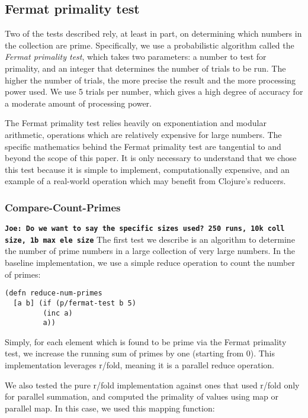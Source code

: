 \documentclass[12pt]{article}
\newcommand{\comment}[1]{{\bf \tt  {#1}}}
\newcommand{\joecomment}[1]{\textcolor{JoesGold}{\comment{Joe: {#1}}}}
\begin{document}
\subsection{Fermat primality test}\label{sec:fermat}
Two of the tests described rely, at least in part, on determining which numbers in the collection are prime. Specifically, we use a probabilistic algorithm called the \emph{Fermat primality test}, which takes two parameters: a number to test for primality, and an integer that determines the number of trials to be run. The higher the number of trials, the more precise the result and the more processing power used. We use 5 trials per number, which gives a high degree of accuracy for a moderate amount of processing power.

The Fermat primality test relies heavily on exponentiation and modular arithmetic, operations which are relatively expensive for large numbers. The specific mathematics behind the Fermat primality test are tangential to and beyond the scope of this paper. It is only necessary to understand that we chose this test because it is simple to implement, computationally expensive, and an example of a real-world operation which may benefit from Clojure's reducers.

\subsubsection{Compare-Count-Primes}\label{sec:count-primes}
\joecomment{Do we want to say the specific sizes used? 250 runs, 10k coll size, 1b max ele size}
The first test we describe is an algorithm to determine the number of prime numbers in a large collection of very large numbers. In the baseline implementation, we use a simple reduce operation to count the number of primes:

\begin{verbatim}
(defn reduce-num-primes
  [a b] (if (p/fermat-test b 5)
         (inc a)
         a))
\end{verbatim}

Simply, for each element which is found to be prime via the Fermat primality test, we increase the running sum of primes by one (starting from 0). This implementation leverages r/fold, meaning it is a parallel reduce operation.

We also tested the pure r/fold implementation against ones that used r/fold only for parallel summation, and computed the primality of values using map or parallel map. In this case, we used this mapping function:
\end{document}
